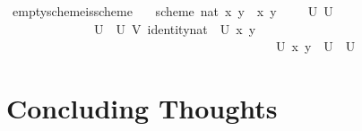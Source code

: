 \documentclass[12pt]{scrartcl}
\begin{document}
\begin{isabelle}
\isamarkupfalse%
\ empty{\isacharunderscore}{\kern0pt}scheme{\isacharunderscore}{\kern0pt}is{\isacharunderscore}{\kern0pt}scheme{\isacharcolon}{\kern0pt}\isanewline
\ \ \ {\isachardoublequoteopen}scheme\ {\isacharbraceleft}{\kern0pt}{}{\isacharcolon}{\kern0pt}{\isacharcolon}{\kern0pt}nat{\isacharbraceright}{\kern0pt}\ {\isacharparenleft}{\kern0pt}{\isasymlambda}x\ y{\isachardot}{\kern0pt}\ {}{\isacharparenright}{\kern0pt}\ {\isacharparenleft}{\kern0pt}{\isasymlambda}x\ y{\isachardot}{\kern0pt}\ {}{\isacharparenright}{\kern0pt}\ {}\ {}\ {\isacharbraceleft}{\kern0pt}{\isacharbraceright}{\kern0pt}\ {\isacharparenleft}{\kern0pt}{\isasymlambda}U{\isachardot}{\kern0pt}\ U{\isacharequal}{\kern0pt}{\isacharbraceleft}{\kern0pt}{\isacharbraceright}{\kern0pt}{\isacharparenright}{\kern0pt}\ \isanewline
\ \ \ \ \ \ \ \ \ \ \ \ \ \ {\isacharparenleft}{\kern0pt}{\isasymlambda}U{\isachardot}{\kern0pt}\ {\isacharbraceleft}{\kern0pt}{}{\isacharbraceright}{\kern0pt}{\isacharparenright}{\kern0pt}\ {\isacharparenleft}{\kern0pt}{\isasymlambda}U\ V{\isachardot}{\kern0pt}\ identity{\isacharbraceleft}{\kern0pt}{}{\isacharcolon}{\kern0pt}{\isacharcolon}{\kern0pt}nat{\isacharbraceright}{\kern0pt}{\isacharparenright}{\kern0pt}\ {}\ {\isacharparenleft}{\kern0pt}{\isasymlambda}U\ x\ y{\isachardot}{\kern0pt}\ {}{\isacharparenright}{\kern0pt}\ \isanewline
\ \ \ \ \ \ \ \ \ \ \ \ \ \ \ \ \ \ \ \ \ \ \ \ \ \ \ \ \ \ \ \ \ \ \ \ \ \ \ \ \ \ \ {\isacharparenleft}{\kern0pt}{\isasymlambda}U\ x\ y{\isachardot}{\kern0pt}\ {}{\isacharparenright}{\kern0pt}\ {\isacharparenleft}{\kern0pt}{\isasymlambda}U{\isachardot}{\kern0pt}\ {}{\isacharparenright}{\kern0pt}\ {\isacharparenleft}{\kern0pt}{\isasymlambda}U{\isachardot}{\kern0pt}\ {}{\isacharparenright}{\kern0pt}{\isachardoublequoteclose}
\end{isabelle}

\section{Concluding Thoughts}
\end{document}
